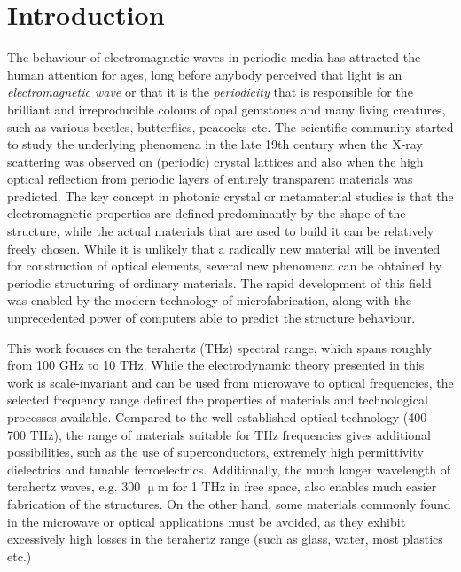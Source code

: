 



\section{Introduction} %
The behaviour of electromagnetic waves in periodic media has attracted the human attention for ages, long before anybody perceived that light is an \textit{electromagnetic wave} or that it is the \textit{periodicity} that is responsible for the brilliant and irreproducible colours of opal gemstones and many living creatures, such as various beetles, butterflies, peacocks etc. %
The scientific community started to study the underlying phenomena in the late 19th century when the X-ray scattering was observed on (periodic) crystal lattices and also when the high optical reflection from periodic layers of entirely transparent materials was predicted. %
The key concept in photonic crystal or metamaterial studies is that the electromagnetic properties are defined predominantly by the shape of the structure, while the actual materials that are used to build it can be relatively freely chosen. %
While it is unlikely that a radically new material will be invented for construction of optical elements, several new phenomena can be obtained by periodic structuring of ordinary materials. The rapid development of this field was enabled by the modern technology of microfabrication, along with the unprecedented power of computers able to predict the structure behaviour.


This work focuses on the terahertz (THz) spectral range, which spans roughly from 100 GHz to 10 THz. While the electrodynamic theory presented in this work is scale-invariant and can be used from microwave to optical frequencies, the selected frequency range defined the properties of materials and technological processes available. Compared to the well established optical technology (400---700 THz), the range of materials suitable for THz frequencies gives additional possibilities, such as the use of superconductors, extremely high permittivity dielectrics and tunable ferroelectrics. Additionally, the much longer wavelength of terahertz waves, e.g. 300 $\upmu$m for 1 THz in free space, also enables much easier fabrication of the structures. On the other hand, some materials commonly found in the microwave or optical applications must be avoided, as they exhibit excessively high losses in the terahertz range (such as glass, water, most plastics etc.)

